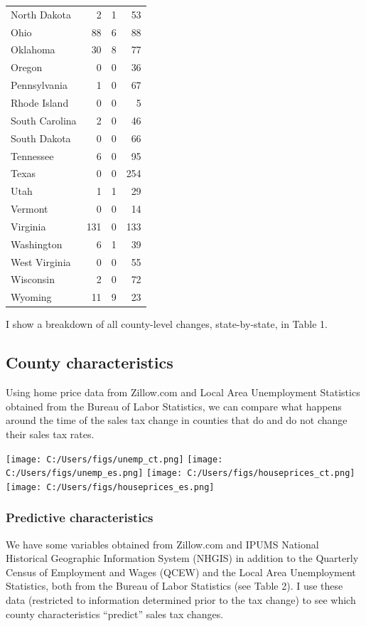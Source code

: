 \documentclass[]{article}
\begin{document}
\begin{table}
\begin{tabular}[t]{lrrr}
North Dakota & 2 & 1 & 53\\
Ohio & 88 & 6 & 88\\
\addlinespace
Oklahoma & 30 & 8 & 77\\
Oregon & 0 & 0 & 36\\
Pennsylvania & 1 & 0 & 67\\
Rhode Island & 0 & 0 & 5\\
South Carolina & 2 & 0 & 46\\
\addlinespace
South Dakota & 0 & 0 & 66\\
Tennessee & 6 & 0 & 95\\
Texas & 0 & 0 & 254\\
Utah & 1 & 1 & 29\\
Vermont & 0 & 0 & 14\\
\addlinespace
Virginia & 131 & 0 & 133\\
Washington & 6 & 1 & 39\\
West Virginia & 0 & 0 & 55\\
Wisconsin & 2 & 0 & 72\\
Wyoming & 11 & 9 & 23\\
\bottomrule
\end{tabular}
\end{table}

I show a breakdown of all county-level changes, state-by-state, in Table
1.

\subsection{County characteristics}\label{county-characteristics}

Using home price data from Zillow.com and Local Area Unemployment
Statistics obtained from the Bureau of Labor Statistics, we can compare
what happens around the time of the sales tax change in counties that do
and do not change their sales tax rates.

\texttt{[image: C:/Users/figs/unemp\_ct.png]}
\texttt{[image: C:/Users/figs/unemp\_es.png]}
\texttt{[image: C:/Users/figs/houseprices\_ct.png]}
\texttt{[image: C:/Users/figs/houseprices\_es.png]}

\subsubsection{Predictive
characteristics}\label{predictive-characteristics}

We have some variables obtained from Zillow.com and IPUMS National
Historical Geographic Information System (NHGIS) in addition to the
Quarterly Census of Employment and Wages (QCEW) and the Local Area
Unemployment Statistics, both from the Bureau of Labor Statistics (see
Table 2). I use these data (restricted to information determined prior
to the tax change) to see which county characteristics ``predict'' sales
tax changes.
\end{document}
